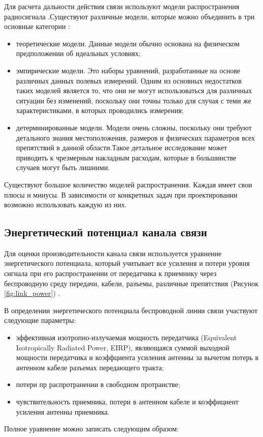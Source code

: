 Для расчета дальности действия связи используют модели распространения радиосигнала \cite{ElChall2019, Zhang2021, Caso2015, Kang2020}.Существуют различные модели, которые можно объединить в три основные категории \cite{Oni2017}:
  \begin{itemize}
    \item теоретические модели. Данные модели обычно основана на физическом предположении об идеальных условиях;
    \item эмпирические модели. Это наборы уравнений, разработанные на основе различных данных полевых измерений. Одним из основных недостатков таких моделей является то, что они не могут использоваться для различных ситуации без изменений, поскольку они точны только для случая с теми же характеристиками, в которых проводились измерения;
    \item детерминированные модели. Модели очень сложны, поскольку они требуют детального знания местоположения, размеров и физических параметров всех препятствий в данной области.Такое детальное исследование может приводить к чрезмерным накладным расходам, которые в большинстве случаев могут быть лишними.
  \end{itemize}

Существуют большое количество моделей распространения. Каждая имеет свои плюсы и минусы. В зависимости от конкретных задач при проектировании возможно использовать каждую из них. 

\subsection{Энергетический потенциал канала связи}
Для оценки производительности канала связи используется уравнение энергетического потенциала, который учитывает все усиления и потери уровня сигнала при его распространении от передатчика к приемнику через беспроводную  среду передачи, кабели, разъемы, различные препятствия (Рисунок \cref{fig:link_power}) \cite{Proletarsky}.

В определении энергетического потенциала беспроводной линии связи участвуют следующие параметры:
\begin{itemize}
  \item эффективная изотропно-излучаемая мощность передатчика (Equivalent Isotropically Radiated Power, EIRP), являющаяся суммой выходной мощности передатчика и коэффциента усиления антенны за вычетом потерь в антенном кабеле разъемах передающего тракта;
  \item потери пр распротранении в свободном протранстве;
  \item чувствительность приемника, потери в антенном кабеле и коэффициент усиления антенны приемника.
\end{itemize}
Полное уравнение можно записать следующим образом:

